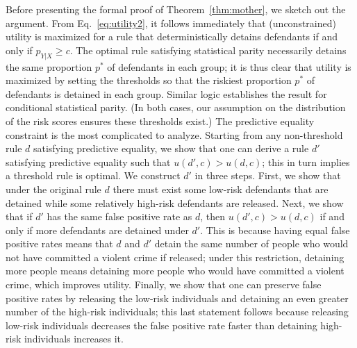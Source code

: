 \documentclass[sigconf]{acmart}
\begin{document}
Before presenting the formal proof of Theorem~\ref{thm:mother}, we sketch out the argument. From Eq.~\eqref{eq:utility2}, it follows immediately that (unconstrained) utility is maximized for a rule that deterministically detains defendants if and only if $p_{Y|X} \geq c$.
The optimal rule satisfying statistical parity necessarily detains the same proportion $p^*$ of defendants in each group; 
it is thus clear that utility is maximized by setting the thresholds so that the riskiest proportion $p^*$ of defendants is detained in each group.
Similar logic establishes the result for conditional statistical parity. 
(In both cases, our assumption on the distribution of the risk scores ensures these thresholds exist.)
The predictive equality constraint 
is the most complicated to analyze.
Starting from any non-threshold rule $d$ satisfying predictive equality, 
we show that one can derive a rule $d'$ satisfying predictive equality
such that $u(d', c) > u(d,c)$; this in turn implies a threshold rule is optimal.
We construct $d'$ in three steps.
First, we show that under the original rule $d$ there must exist some low-risk defendants that are detained while some relatively high-risk defendants
are released.
Next, we show that if $d'$ has the same false positive rate as $d$,
then $u(d', c) > u(d,c)$ if and only if more defendants are detained under $d'$.
This is because having equal false positive rates means that $d$ and $d'$ 
detain the same number of people who would not have committed a violent crime if released;
under this restriction, detaining more people means detaining more people who would have committed
a violent crime, which improves utility.
Finally, we show that one can preserve false positive rates by releasing the low-risk individuals
and detaining an even greater number of the high-risk individuals;
this last statement follows because releasing low-risk individuals decreases the false positive rate
faster than detaining high-risk individuals increases it.
\end{document}
